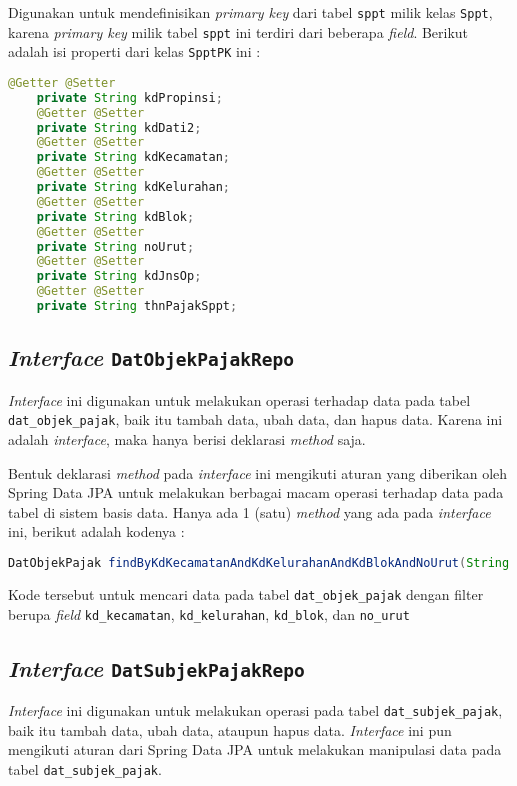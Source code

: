 \documentclass[pdftex,12pt, oneside]{article}
\begin{document}
Digunakan untuk mendefinisikan \textit{primary key} dari tabel \texttt{sppt} milik kelas \texttt{Sppt}, karena \textit{primary key} milik tabel \texttt{sppt} ini terdiri dari beberapa \textit{field}. Berikut adalah isi properti dari kelas \texttt{SpptPK} ini : 

\begin{lstlisting}[language=java]
    @Getter @Setter
    private String kdPropinsi;
    @Getter @Setter
    private String kdDati2;
    @Getter @Setter
    private String kdKecamatan;
    @Getter @Setter
    private String kdKelurahan;
    @Getter @Setter
    private String kdBlok;
    @Getter @Setter
    private String noUrut;
    @Getter @Setter
    private String kdJnsOp;
    @Getter @Setter
    private String thnPajakSppt;
\end{lstlisting}

\subsection{\textit{Interface} \texttt{DatObjekPajakRepo}}

\textit{Interface} ini digunakan untuk melakukan operasi terhadap data pada tabel \texttt{dat\_objek\_pajak}, baik itu tambah data, ubah data, dan hapus data. Karena ini adalah \textit{interface}, maka hanya berisi deklarasi \textit{method} saja.

Bentuk deklarasi \textit{method} pada \textit{interface} ini mengikuti aturan yang diberikan oleh Spring Data JPA untuk melakukan berbagai macam operasi terhadap data pada tabel di sistem basis data. Hanya ada 1 (satu) \textit{method} yang ada pada \textit{interface} ini, berikut adalah kodenya :

\begin{lstlisting}[language=java]
    DatObjekPajak findByKdKecamatanAndKdKelurahanAndKdBlokAndNoUrut(String kdKecamatan, String kdKelurahan, String kdBlok, String noUrut);
\end{lstlisting}

Kode tersebut untuk mencari data pada tabel \texttt{dat\_objek\_pajak} dengan filter berupa \textit{field} \texttt{kd\_kecamatan}, \texttt{kd\_kelurahan}, \texttt{kd\_blok}, dan \texttt{no\_urut}

\subsection{\textit{Interface} \texttt{DatSubjekPajakRepo}}

\textit{Interface} ini digunakan untuk melakukan operasi pada tabel \texttt{dat\_subjek\_pajak}, baik itu tambah data, ubah data, ataupun hapus data. \textit{Interface} ini pun mengikuti aturan dari Spring Data JPA untuk melakukan manipulasi data pada tabel \texttt{dat\_subjek\_pajak}.
\end{document}
